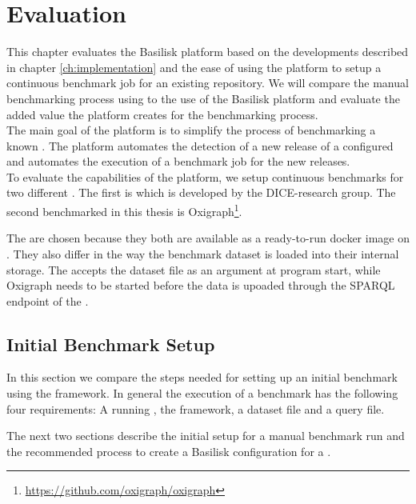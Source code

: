\chapter{Evaluation}
\label{ch:evaluation}

This chapter evaluates the Basilisk platform based on the developments described in chapter \ref{ch:implementation} and the ease of using the platform to setup a continuous benchmark job for an existing repository.
We will compare the manual benchmarking process using \iguana{} to the use of the Basilisk platform and evaluate the added value the platform creates for the benchmarking process.
\\

The main goal of the platform is to simplify the process of benchmarking a known \tsp{}. 
The platform automates the detection of a new release of a configured \ts{} and  automates the execution of a benchmark job for the new releases.
\\

To evaluate the capabilities of the platform, we setup continuous benchmarks for two different \tsp{}.
The first \ts{} is \tentris{} \cite{bigerlTentrisTensorBasedTriple2020} which is developed by the DICE-research group.
The second \ts{} benchmarked in this thesis is Oxigraph\footnote{\url{https://github.com/oxigraph/oxigraph}}.

The \tsp{} are chosen because they both are available as a ready-to-run docker image on \dockh{}.
They also differ in the way the benchmark dataset is loaded into their internal storage.
The \tentris{} \ts{} accepts the dataset file as an argument at program start, while Oxigraph needs to be started before the data is upoaded through the SPARQL endpoint of the \ts{}.


\section{Initial Benchmark Setup}
In this section we compare the steps needed for setting up an initial \ts{} benchmark using the \iguana{} framework.
In general the execution of a benchmark has the following four requirements:
A running \ts{}, the \iguana{} framework, a dataset file and a query file.

The next two sections describe the initial setup for a manual benchmark run and the recommended process to create a Basilisk configuration for a \ts{}.


